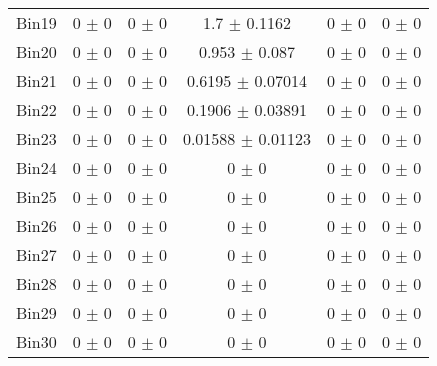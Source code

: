 \begin{tabular}{@{\extracolsep{4pt}}lccccc@{}}
     Bin19 & 0 $\pm$ 0 & 0 $\pm$ 0 & 1.7 $\pm$ 0.1162 & 0 $\pm$ 0 & 0 $\pm$ 0 \\ 
     Bin20 & 0 $\pm$ 0 & 0 $\pm$ 0 & 0.953 $\pm$ 0.087 & 0 $\pm$ 0 & 0 $\pm$ 0 \\ 
     Bin21 & 0 $\pm$ 0 & 0 $\pm$ 0 & 0.6195 $\pm$ 0.07014 & 0 $\pm$ 0 & 0 $\pm$ 0 \\ 
     Bin22 & 0 $\pm$ 0 & 0 $\pm$ 0 & 0.1906 $\pm$ 0.03891 & 0 $\pm$ 0 & 0 $\pm$ 0 \\ 
     Bin23 & 0 $\pm$ 0 & 0 $\pm$ 0 & 0.01588 $\pm$ 0.01123 & 0 $\pm$ 0 & 0 $\pm$ 0 \\ 
     Bin24 & 0 $\pm$ 0 & 0 $\pm$ 0 & 0 $\pm$ 0 & 0 $\pm$ 0 & 0 $\pm$ 0 \\ 
     Bin25 & 0 $\pm$ 0 & 0 $\pm$ 0 & 0 $\pm$ 0 & 0 $\pm$ 0 & 0 $\pm$ 0 \\ 
     Bin26 & 0 $\pm$ 0 & 0 $\pm$ 0 & 0 $\pm$ 0 & 0 $\pm$ 0 & 0 $\pm$ 0 \\ 
     Bin27 & 0 $\pm$ 0 & 0 $\pm$ 0 & 0 $\pm$ 0 & 0 $\pm$ 0 & 0 $\pm$ 0 \\ 
     Bin28 & 0 $\pm$ 0 & 0 $\pm$ 0 & 0 $\pm$ 0 & 0 $\pm$ 0 & 0 $\pm$ 0 \\ 
     Bin29 & 0 $\pm$ 0 & 0 $\pm$ 0 & 0 $\pm$ 0 & 0 $\pm$ 0 & 0 $\pm$ 0 \\ 
     Bin30 & 0 $\pm$ 0 & 0 $\pm$ 0 & 0 $\pm$ 0 & 0 $\pm$ 0 & 0 $\pm$ 0 \\ 
\hline\hline
  \end{tabular}
